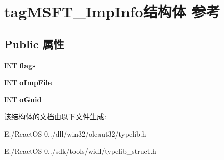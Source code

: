 \hypertarget{structtag_m_s_f_t___imp_info}{}\section{tag\+M\+S\+F\+T\+\_\+\+Imp\+Info结构体 参考}
\label{structtag_m_s_f_t___imp_info}
\subsection*{Public 属性}
\begin{DoxyCompactItemize}
\item 
\mbox{\label{structtag_m_s_f_t___imp_info_af46d974fb23e4c6e114be4580ff3e6d9}} 
I\+NT {\bfseries flags}
\item 
\mbox{\label{structtag_m_s_f_t___imp_info_acb5daf041fb1bceaf6f464eb33b6d9f8}} 
I\+NT {\bfseries o\+Imp\+File}
\item 
\mbox{\label{structtag_m_s_f_t___imp_info_a4c2a8d303591e0cc36c520ebb540c855}} 
I\+NT {\bfseries o\+Guid}
\end{DoxyCompactItemize}


该结构体的文档由以下文件生成\+:\begin{DoxyCompactItemize}
\item 
E\+:/\+React\+O\+S-\/0../dll/win32/oleaut32/typelib.\+h\item 
E\+:/\+React\+O\+S-\/0../sdk/tools/widl/typelib\+\_\+struct.\+h\end{DoxyCompactItemize}
